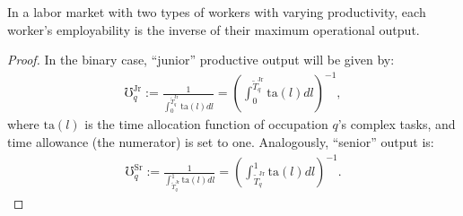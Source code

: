 \documentclass[hidelinks, nonatbib]{elsarticle}
\begin{document}
\begin{theorem}
    \label{bet}
    In a labor market with two types of workers with varying productivity, each worker's employability is the inverse of their maximum operational output.
    \begin{proof}
        In the binary case, ``junior'' productive output will be given by:
        \begin{gather}
            \mho_{q}^{\text{Jr}} 
            :=
            \frac{
                1
            }{
                \int_{0}^{\tilde{T}_{q}^{\text{Jr}}}
                \text{ta}(l)
                dl
            }
            = 
            \left(
                \int_{0}^{\tilde{T}_{q}^{\text{Jr}}}
                    \text{ta}(l)
                    dl
            \right) ^ {-1}
            ,
        \end{gather}
        where $\text{ta}(l)$ is the time allocation function of occupation $q$'s complex tasks, and time allowance (the numerator) is set to one. Analogously, ``senior'' output is:
        \begin{gather}
            \mho_{q}^{\text{Sr}}
            :=
            \frac{
                1
            }{
                \int_{\tilde{T}_{q}^{\text{Jr}}}^{1}
                \text{ta}(l)
                dl
            }
            = 
            \left(
                \int_{\tilde{T}_{q}^{\text{Jr}}}^{1}
                    \text{ta}(l)
                    dl
            \right) ^ {-1}
            .
        \end{gather}


\end{proof}
\end{theorem}
\end{document}
